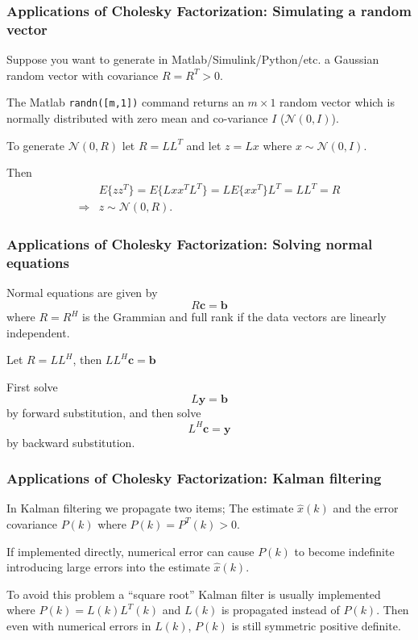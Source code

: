 \documentclass{beamer}
\begin{document}
\begin{frame}\frametitle{Applications of Cholesky Factorization: Simulating a random vector}

	Suppose you want to generate in Matlab/Simulink/Python/etc. a Gaussian random vector with covariance $R = R^T>0$.
	
	\vfill

	The Matlab \texttt{randn([m,1])} command returns an $m\times 1$ random vector which is normally distributed with zero mean and co-variance $I$ ($\mathcal{N}(0,I)$).  
	
	\vfill
	
	To generate $\mathcal{N}(0,R)$ let $R = LL^T$ and let $z = Lx$ where $x \sim \mathcal{N}(0,I)$. 
	
	\vfill 

	Then 
	\begin{align*}
		& E\{zz^T\} = E\{Lxx^TL^T\} = LE\{xx^T\}L^T = LL^T = R \\
		\Rightarrow & z \sim \mathcal{N}(0,R).
	\end{align*}

\end{frame}

\begin{frame}\frametitle{Applications of Cholesky Factorization: Solving normal equations}

	Normal equations are given by
	\[
		R\mathbf{c} = \mathbf{b}
	\]
	where $R=R^H$ is the Grammian and full rank if the data vectors are linearly independent.
	
	\vfill
	
	Let $R = LL^H$, then $LL^H \mathbf{c} = \mathbf{b}$
	
	\vfill

	First solve 
	\[ 
	L \mathbf{y} = \mathbf{b}
	\]
	by forward substitution, and then solve
	\[ 
	L^H \mathbf{c} = \mathbf{y}
	\]
	by backward substitution.
\end{frame}

\begin{frame}\frametitle{Applications of Cholesky Factorization: Kalman filtering}
	In Kalman filtering we propagate two items;  The estimate $\hat{x}(k)$ and the error covariance $P(k)$ where $P(k)=P^T(k) > 0$.
	
	\vfill

	If implemented directly, numerical error can cause $P(k)$ to become indefinite introducing large errors into the estimate $\hat{x}(k)$.
	
	\vfill

	To avoid this problem a ``square root'' Kalman filter is usually implemented where $P(k) = L(k)L^T(k)$ and $L(k)$ is propagated instead of $P(k)$.  Then even with numerical errors in $L(k)$, $P(k)$ is still symmetric positive definite.

\end{frame}
\end{document}
